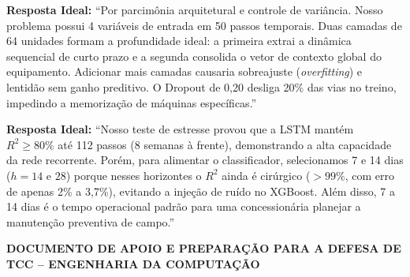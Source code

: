 \documentclass[10pt,a4paper]{article}
\begin{document}
\begin{bancabox}
\textbf{Resposta Ideal:} ``Por parcimônia arquitetural e controle de variância. Nosso problema possui 4 variáveis de entrada em 50 passos temporais. Duas camadas de 64 unidades formam a profundidade ideal: a primeira extrai a dinâmica sequencial de curto prazo e a segunda consolida o vetor de contexto global do equipamento. Adicionar mais camadas causaria sobreajuste (\textit{overfitting}) e lentidão sem ganho preditivo. O Dropout de 0,20 desliga 20\% das vias no treino, impedindo a memorização de máquinas específicas.''
\end{bancabox}

\begin{bancabox}[Pergunta 4: ``Se a rede aguentou prever até 112 passos, por que vocês só passaram h=14 e h=28 para o XGBoost?'']
\textbf{Resposta Ideal:} ``Nosso teste de estresse provou que a LSTM mantém $R^2 \ge 80\%$ até 112 passos (8 semanas à frente), demonstrando a alta capacidade da rede recorrente. Porém, para alimentar o classificador, selecionamos 7 e 14 dias ($h=14$ e $28$) porque nesses horizontes o $R^2$ ainda é cirúrgico ($> 99\%$, com erro de apenas 2\% a 3,7\%), evitando a injeção de ruído no XGBoost. Além disso, 7 a 14 dias é o tempo operacional padrão para uma concessionária planejar a manutenção preventiva de campo.''
\end{bancabox}

\vspace{8pt}
\noindent\makebox[\linewidth]{\rule{\textwidth}{0.8pt}}
\begin{center}
  \footnotesize\textsf{\color{NavyBlue}\textbf{DOCUMENTO DE APOIO E PREPARAÇÃO PARA A DEFESA DE TCC -- ENGENHARIA DA COMPUTAÇÃO}}
\end{center}
\end{document}
